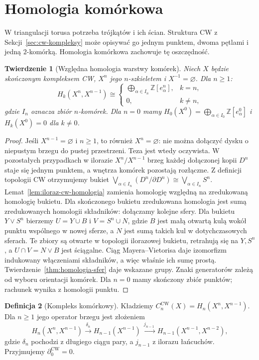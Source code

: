 \documentclass[11pt,a4paper,oneside]{report}
\newcommand{\Z}{\mathbb{Z}}
\theoremstyle{plain}
\newtheorem{twierdzenie}{Twierdzenie}[section]
\theoremstyle{definition}
\newtheorem{definicja}[twierdzenie]{Definicja}
\theoremstyle{remark}
\begin{document}
\section{Homologia komórkowa}
\label{sec:homologia-komorkowa}

W triangulacji torusa potrzeba
trójkątów i ich ścian. Struktura
CW z Sekcji~\ref{sec:cw-kompleksy}
może opisywać go jednym punktem,
dwoma pętlami i jedną
$2$-komórką. Homologia komórkowa
zachowuje tę oszczędność.

\begin{twierdzenie}[Względna homologia warstwy komórek]
\label{thm:warstwa-komorek}
Niech $X$ będzie skończonym
kompleksem CW, $X^n$ jego
$n$-szkieletem i $X^{-1}=\varnothing$.
Dla $n\geq1$:
\[
 H_k(X^n,X^{n-1})
 \cong
 \begin{cases}
 \displaystyle\bigoplus_{\alpha\in I_n}\Z[e_\alpha^n],
 &k=n,\\[3pt]0,&k\ne n,
 \end{cases}
\]
gdzie $I_n$ oznacza zbiór $n$-komórek.
Dla $n=0$ mamy
$H_0(X^0)=\bigoplus_{\alpha\in I_0}\Z[e_\alpha^0]$
i $H_k(X^0)=0$ dla $k\ne0$.
\end{twierdzenie}
\begin{proof}
Jeśli $X^{n-1}=\varnothing$ i $n\geq1$, to również $X^n=\varnothing$:
nie można dołączyć dysku o niepustym brzegu do pustej przestrzeni.
Teza jest wtedy oczywista. W pozostałych przypadkach
w ilorazie $X^n/X^{n-1}$
brzeg każdej dołączonej kopii
$D^n$ staje się jednym punktem,
a wnętrza komórek pozostają
rozłączne. Z definicji topologii
CW otrzymujemy bukiet
$\bigvee_{\alpha\in I_n}
(D^n/\partial D^n)\cong
\bigvee_{\alpha\in I_n}S^n$.
Lemat~\ref{lem:iloraz-cw-homologia}
zamienia homologię względną
na zredukowaną homologię bukietu.
Dla skończonego bukietu
zredukowana homologia jest sumą
zredukowanych homologii składników:
dołączamy kolejne sfery. Dla bukietu $Y\vee S^n$
bierzemy $U=Y\cup B$ i $V=S^n\cup N$, gdzie $B$ jest małą
otwartą kulą wokół punktu wspólnego w nowej sferze, a $N$
jest sumą takich kul w dotychczasowych sferach.
Te zbiory są otwarte w topologii ilorazowej bukietu,
retrahują się na $Y,S^n$, a $U\cap V=N\vee B$ jest ściągalne.
Ciąg Mayera--Vietorisa daje izomorfizm indukowany włączeniami
składników, a więc właśnie ich sumę prostą.
Twierdzenie~\ref{thm:homologia-sfer}
daje wskazane grupy.
Znaki generatorów zależą
od wyboru orientacji komórek.
Dla $n=0$ mamy skończony
zbiór punktów; rachunek wynika
z homologii punktu.
\end{proof}

\begin{definicja}[Kompleks komórkowy]
\label{def:kompleks-komorkowy}
Kładziemy
$C_n^{\mathrm{CW}}(X)=H_n(X^n,X^{n-1})$.
Dla $n\geq1$ jego operator brzegu
jest złożeniem
\begin{equation}\label{eq:cellular-boundary}
 H_n(X^n,X^{n-1})
 \xrightarrow{\ \delta_n\ }
 H_{n-1}(X^{n-1})
 \xrightarrow{\ j_{n-1}\ }
 H_{n-1}(X^{n-1},X^{n-2}),
\end{equation}
gdzie $\delta_n$ pochodzi z
długiego ciągu pary, a
$j_{n-1}$ z ilorazu łańcuchów.
Przyjmujemy $\partial_0^{\mathrm{CW}}=0$.
\end{definicja}
\end{document}
